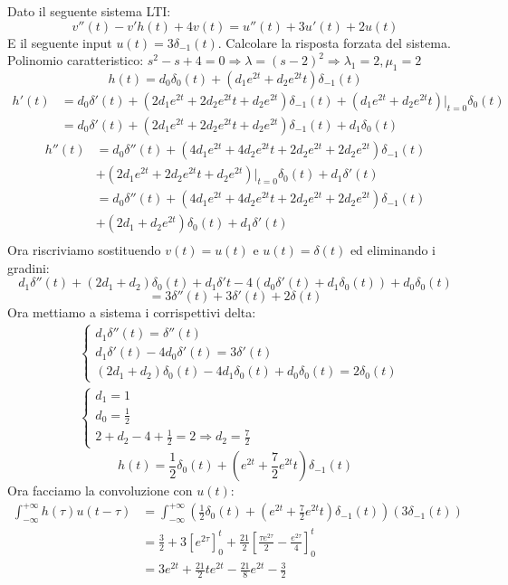 \documentclass[a4paper]{article}
\begin{document}
Dato il seguente sistema LTI:
\[v''(t) - v'h(t) + 4v(t) = u''(t) + 3u'(t) + 2u(t)\]
E il seguente input $u(t) = 3\delta_{-1}(t)$. Calcolare la risposta forzata del sistema.\\
Polinomio caratteristico: $s^2 - s + 4 = 0 \Longrightarrow \lambda = (s-2)^2 \Longrightarrow \lambda_1 = 2, \mu_1 = 2$\\
\[h(t) = d_0\delta_0(t) + (d_1e^{2t} + d_2e^{2t}t)\delta_{-1}(t)\]
\begin{align*}
    h'(t) &= d_0\delta'(t) + (2d_1e^{2t} + 2d_2e^{2t}t + d_2e^{2t})\delta_{-1}(t) + (d_1e^{2t} + d_2e^{2t}t)\bigg|_{t=0}\delta_{0}(t)\\
    &= d_0\delta'(t) + (2d_1e^{2t} + 2d_2e^{2t}t + d_2e^{2t})\delta_{-1}(t) + d_1\delta_{0}(t)
\end{align*}
\begin{align*}
    h''(t) &= d_0\delta''(t) + (4d_1e^{2t} + 4d_2e^{2t}t + 2d_2e^{2t} + 2d_2e^{2t})\delta_{-1}(t)\\
    &+ (2d_1e^{2t} + 2d_2e^{2t}t + d_2e^{2t})\bigg|_{t=0}\delta_{0}(t) + d_1\delta'(t)\\
    &= d_0\delta''(t) + (4d_1e^{2t} + 4d_2e^{2t}t + 2d_2e^{2t} + 2d_2e^{2t})\delta_{-1}(t)\\
    &+ (2d_1 + d_2e^{2t})\delta_{0}(t) + d_1\delta'(t)\\
\end{align*}
Ora riscriviamo sostituendo $v(t) = u(t)$ e $u(t) = \delta(t)$ ed eliminando i gradini:
\[d_1\delta''(t) + (2d_1 + d_2)\delta_0(t) + d_1\delta'{t} - 4(d_0\delta'(t) + d_1\delta_0(t)) + d_0\delta_0(t)\]
\[= 3\delta''(t) + 3\delta'(t) + 2\delta(t)\]
Ora mettiamo a sistema i corrispettivi delta:
\begin{align*}
&\begin{cases}
    d_1\delta''(t) = \delta''(t)\\
    d_1\delta'(t) - 4d_0\delta'(t) = 3\delta'(t)\\
    (2d_1 + d_2)\delta_0(t) - 4d_1\delta_0(t) + d_0\delta_0(t) = 2\delta_0(t)
\end{cases}\\
&\begin{cases}
    d_1 = 1\\
    d_0 = \frac{1}{2}\\
    2 + d_2 - 4 + \frac{1}{2} = 2 \Longrightarrow d_2 = \frac{7}{2}
\end{cases} 
\end{align*}
\[h(t) = \frac{1}{2}\delta_0(t) + \left(e^{2t} + \frac{7}{2}e^{2t}t\right)\delta_{-1}(t)\]
Ora facciamo la convoluzione con $u(t)$:
\begin{align*}
    \int_{-\infty}^{+\infty} h(\tau)u(t-\tau) &= \int_{-\infty}^{+\infty} \left(\frac{1}{2}\delta_0(t) + \left(e^{2t} + \frac{7}{2}e^{2t}t\right)\delta_{-1}(t)\right)(3\delta_{-1}(t)) \\
    &= \frac{3}{2} + 3\left[e^{2\tau}\right]_0^t + \frac{21}{2}\left[\frac{\tau e^{2\tau}}{2} - \frac{e^{2\tau}}{4}\right]_0^t\\
    &= 3e^{2t} + \frac{21}{2}te^{2t} - \frac{21}{8}e^{2t} - \frac{3}{2}\\
\end{align*}
\end{document}
